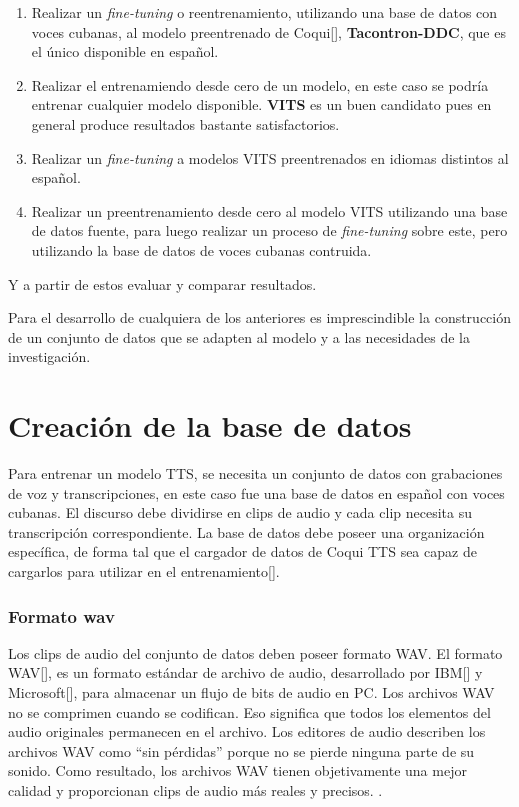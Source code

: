\begin{enumerate}
	\item Realizar un \textit{fine-tuning} o reentrenamiento, utilizando una base de datos con voces cubanas, al modelo preentrenado de Coqui[\cite{coqui-doc}], \textbf{Tacontron-DDC}, que es el único disponible en español. 
	
	\item Realizar el entrenamiendo desde cero de un modelo, en este caso se podría entrenar cualquier modelo disponible. \textbf{VITS} es un buen candidato pues en general produce resultados bastante satisfactorios.
	
	\item Realizar un \textit{fine-tuning} a modelos VITS preentrenados en idiomas distintos al español.
	
	\item Realizar un preentrenamiento desde cero al modelo VITS utilizando una base de datos fuente, para luego realizar un proceso de \textit{fine-tuning} sobre este, pero utilizando la base de datos de voces cubanas contruida.
	
	
	
\end{enumerate}

Y a partir de estos evaluar y comparar resultados.

Para el desarrollo de cualquiera de los anteriores es imprescindible la construcción de un conjunto de datos que se adapten al modelo y a las necesidades de la investigación.


\section{Creación de la base de datos}

Para entrenar un modelo TTS, se necesita un conjunto de datos con grabaciones de voz y transcripciones, en este caso fue una base de datos en español con voces cubanas. El discurso debe dividirse en clips de audio y cada clip necesita su transcripción correspondiente. La base de datos debe poseer una organización específica, de forma tal que el cargador de datos de Coqui TTS sea capaz de cargarlos para utilizar en el entrenamiento[\cite{formatting-dataset}].    

\subsubsection{Formato wav}
Los clips de audio del conjunto de datos deben poseer formato WAV. El formato WAV[\cite{wav}], es un formato estándar de archivo de audio, desarrollado por IBM[\cite{ibm}] y Microsoft[\cite{microsoft}], para almacenar un flujo de bits de audio en PC. Los archivos WAV no se comprimen cuando se codifican. Eso significa que todos los elementos del audio originales permanecen en el archivo. Los editores de audio describen los archivos WAV como ``sin pérdidas'' porque no se pierde ninguna parte de su sonido. Como resultado, los archivos WAV tienen objetivamente una mejor calidad y proporcionan clips de audio más reales y precisos. .


